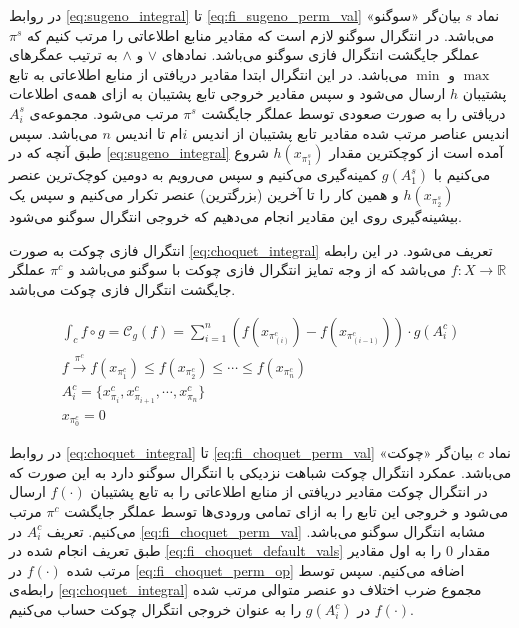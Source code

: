 در روابط
\ref{eq:sugeno_integral} تا \ref{eq:fi_sugeno_perm_val}
نماد $s$ بیان‌گر «سوگنو» می‌‌باشد. در انتگرال‌ سوگنو لازم است که مقادیر منابع اطلاعاتی را مرتب کنیم که $\pi^s$ عملگر جایگشت انتگرال فازی سوگنو می‌باشد. نمادهای $\vee$ و $\wedge$ به ترتیب عمگرهای $\max$ و $\min$ می‌باشد. در این انتگرال ابتدا مقادیر دریافتی از منابع اطلاعاتی به تابع پشتیبان $h$ ارسال می‌شود و سپس مقادیر خروجی تابع پشتیبان به ازای همه‌ی اطلاعات دریافتی را به صورت صعودی توسط عملگر جایگشت $\pi^s$ مرتب می‌شود. مجموعه‌ی $A_i^s$ اندیس عناصر مرتب شده مقادیر تابع پشتیبان از اندیس $i$ام تا اندیس $n$ می‌باشد. سپس طبق آنچه که در \ref{eq:sugeno_integral} آمده است از کوچکترین مقدار $h(x_{\pi_1^s})$ شروع می‌کنیم با $g(A_1^s)$ کمینه‌گیری می‌کنیم و سپس می‌رویم به دومین کوچک‌ترین عنصر $h(x_{\pi_2^s})$ و همین کار را تا آخرین (بزرگترین) عنصر تکرار می‌کنیم و سپس یک بیشینه‌گیری روی این مقادیر انجام می‌دهیم که خروجی انتگرال سوگنو می‌شود.

انتگرال فازی چوکت به صورت \ref{eq:choquet_integral} تعریف می‌شود. در این رابطه
$f : X \rightarrow \mathbb{R}$
می‌باشد که از وجه تمایز انتگرال فازی چوکت با سوگنو می‌‌باشد و $\pi^c$ عملگر جایگشت انتگرال فازی چوکت می‌باشد.

\begin{eqnarray}
\int_{c} f \circ g = \mathcal{C}_g(f) = \sum_{i = 1}^{n} \left( f(x_{\pi_{(i)}^c}) - f(x_{\pi_{(i-1)}^c}) \right) \cdot g(A_i^c)\label{eq:choquet_integral}\\
f \xrightarrow{\pi^c} f(x_{\pi_1^c}) \leq f(x_{\pi_2^c}) \leq \cdots \leq f(x_{\pi_n^c})\label{eq:fi_choquet_perm_op}\\
A_i^c = \{x_{\pi_i}^c, x_{\pi_{i+1}}^c, \cdots, x_{\pi_n}^c\}\label{eq:fi_choquet_perm_val}\\
x_{\pi^c_0} = 0\label{eq:fi_choquet_default_vals}
\end{eqnarray}

در روابط
\ref{eq:choquet_integral} تا \ref{eq:fi_choquet_perm_val}
نماد $c$ بیان‌گر «چوکت» می‌‌باشد. عمکرد انتگرال چوکت شباهت نزدیکی با انتگرال سوگنو دارد به این صورت که در انتگرال چوکت مقادیر دریافتی از منابع اطلاعاتی را به تابع پشتیبان $f(\cdot)$ ارسال می‌شود و خروجی این تابع را به ازای تمامی ورودی‌ها توسط عملگر جایگشت $\pi^c$ مرتب می‌کنیم. تعریف $A_i^c$ در \ref{eq:fi_choquet_perm_val} مشابه انتگرال سوگنو می‌باشد. طبق تعریف انجام شده در \ref{eq:fi_choquet_default_vals} مقدار 0 را به اول مقادیر مرتب شده $f(\cdot)$ در \ref{eq:fi_choquet_perm_op} اضافه می‌کنیم. سپس توسط رابطه‌ی \ref{eq:choquet_integral} مجموع ضرب اختلاف دو عنصر متوالی مرتب شده $f(\cdot)$ در $g(A_i^c)$ را به عنوان خروجی انتگرال چوکت حساب می‌کنیم.

